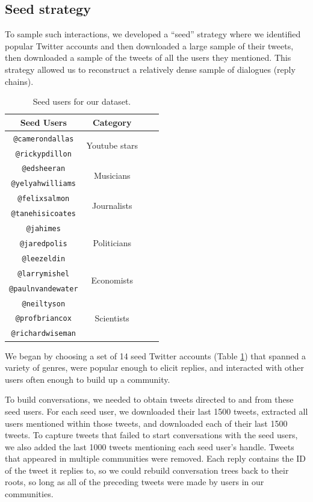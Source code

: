 \documentclass[11pt,letterpaper]{article}
\begin{document}
\subsection{Seed strategy}

To sample such interactions, we developed a ``seed'' strategy where we identified popular Twitter accounts and then downloaded a large sample of their tweets, then downloaded a sample of the tweets of all the users they mentioned. This strategy allowed us to reconstruct a relatively dense sample of dialogues (reply chains).

\begin{table}
\begin{center}
\begin{tabular}{|c|c|c|c|}
\hline
Seed Users & Category \\ %
\hline
{\tt @camerondallas} & \multirow{2}{*}{Youtube stars} \\
{\tt @rickypdillon} & \\
\hline
{\tt @edsheeran} & \multirow{2}{*}{Musicians} \\
{\tt @yelyahwilliams} & \\
\hline
{\tt @felixsalmon} & \multirow{2}{*}{Journalists} \\
{\tt @tanehisicoates} & \\
\hline
{\tt @jahimes} & \multirow{3}{*}{Politicians} \\
{\tt @jaredpolis} & \\
{\tt @leezeldin} & \\
\hline
{\tt @larrymishel} & \multirow{2}{*}{Economists} \\
{\tt @paulnvandewater} & \\
\hline
{\tt @neiltyson} & \multirow{3}{*}{Scientists} \\
{\tt @profbriancox} & \\
{\tt @richardwiseman} & \\
\hline
\end{tabular}
\end{center}
\caption{\label{tab:seed-users} Seed users for our dataset.}
\end{table}

We began by choosing a set of 14 seed Twitter accounts (Table \ref{tab:seed-users}) that spanned a variety of genres, were popular enough to elicit replies, and interacted with other users often enough to build up a community. 

To build conversations, we needed to obtain tweets directed to and from these seed users. For each seed user, we downloaded their last 1500 tweets, extracted all users mentioned within those tweets, and downloaded each of their last 1500 tweets.  To capture tweets that failed to start conversations with the seed users, we also added the last 1000 tweets mentioning each seed user's handle.  Tweets that appeared in multiple communities were removed.  Each reply contains the ID of the tweet it replies to, so we could rebuild conversation trees back to their roots, so long as all of the preceding tweets were made by users in our communities.
\end{document}

